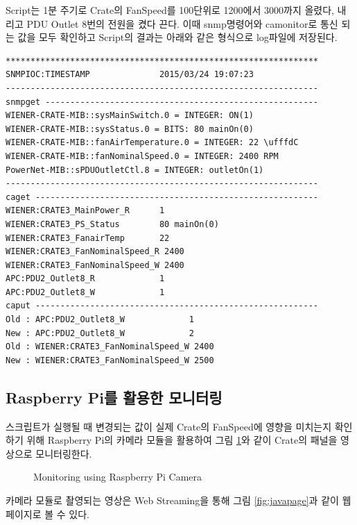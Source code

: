 \documentclass[11pt
  , a4paper
  , article
  , oneside
]{memoir}
\begin{document}
Script는 1분 주기로 Crate의 FanSpeed를 100단위로 1200에서 3000까지 올렸다, 내리고 PDU Outlet 8번의 전원을 켰다 끈다. 이때 snmp명령어와 camonitor로 통신 되는 값을 모두 확인하고 Script의 결과는 아래와 같은 형식으로 log파일에 저장된다.

\begin{lstlisting}[style=termstyle]
***************************************************************
SNMPIOC:TIMESTAMP              2015/03/24 19:07:23
---------------------------------------------------------------
snmpget -------------------------------------------------------
WIENER-CRATE-MIB::sysMainSwitch.0 = INTEGER: ON(1)
WIENER-CRATE-MIB::sysStatus.0 = BITS: 80 mainOn(0) 
WIENER-CRATE-MIB::fanAirTemperature.0 = INTEGER: 22 \ufffdC
WIENER-CRATE-MIB::fanNominalSpeed.0 = INTEGER: 2400 RPM
PowerNet-MIB::sPDUOutletCtl.8 = INTEGER: outletOn(1)
---------------------------------------------------------------
caget ---------------------------------------------------------
WIENER:CRATE3_MainPower_R      1
WIENER:CRATE3_PS_Status        80 mainOn(0)
WIENER:CRATE3_FanairTemp       22
WIENER:CRATE3_FanNominalSpeed_R 2400
WIENER:CRATE3_FanNominalSpeed_W 2400
APC:PDU2_Outlet8_R             1
APC:PDU2_Outlet8_W             1
caput ---------------------------------------------------------
Old : APC:PDU2_Outlet8_W             1
New : APC:PDU2_Outlet8_W             2
Old : WIENER:CRATE3_FanNominalSpeed_W 2400
New : WIENER:CRATE3_FanNominalSpeed_W 2500
\end{lstlisting}

\subsection{Raspberry Pi를 활용한 모니터링}
스크립트가 실행될 때 변경되는 값이 실제 Crate의 FanSpeed에 영향을 미치는지 확인하기 위해 Raspberry Pi의 카메라 모듈을 활용하여 그림 \ref{fig:rpimonitoring}와 같이 Crate의 패널을 영상으로 모니터링한다.

\begin{figure}[!h]
  \centering
              \hfill
              \hfill
  \caption
      {
Monitoring using Raspberry Pi Camera
      }
 \label{fig:rpimonitoring}
\end{figure}

카메라 모듈로 촬영되는 영상은 Web Streaming을 통해 그림 \ref{fig:javapage}과 같이 웹페이지로 볼 수 있다. 
\end{document}

